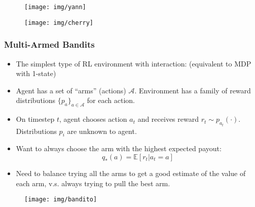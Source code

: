 \documentclass[10pt,a4paper, handout]{beamer}
\newcommand{\A}{\mathcal{A}}
\begin{document}
 
\begin{frame}
\begin{figure}
	\centering
	\texttt{[image: img/yann]}
\end{figure}
\end{frame}
%
\begin{frame}
	\begin{figure}
	\texttt{[image: img/cherry]}
	\end{figure}
\end{frame}


\begin{frame}
	\frametitle{Multi-Armed Bandits}
	\begin{itemize}
		\item The simplest type of RL environment with interaction: (equivalent to
		MDP with 1-state)
		\pause
		\item Agent has a set of ``arms'' 
		(actions) $\A$. Environment has a family of reward distributions
		$\{p_a\}_{a \in \A}$ for each action.
		\pause
		\item On timestep $t$, agent chooses action $a_t$ and receives
		reward $r_t \sim p_{a_t}(\cdot)$. Distributions $p_i$ are unknown to agent.
		\pause
		\item Want to always choose the arm with the highest
		expected payout:
		$$
		q_*(a) = \mathbb{E}[r_t | a_t = a]
		$$
		\pause
		\item Need to balance trying all the arms to get a
		good estimate of the value of each arm, v.s. always trying
		to pull the best arm.
	\end{itemize}
\end{frame}

\begin{frame}
	\begin{figure}
		\centering
		\texttt{[image: img/bandito]}
		\label{fig:bandito}
	\end{figure}
\end{frame}
\end{document}
